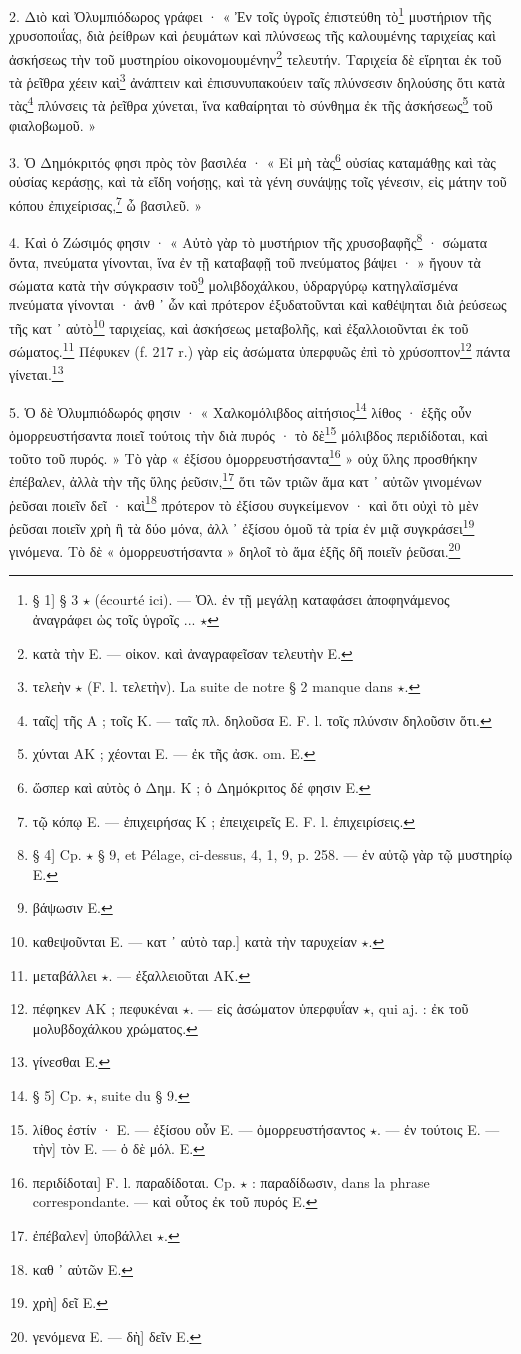 \documentclass[a4paper, 11pt, oneside, polutonikogreek, french]{article}
\begin{document}
2. Διὸ καὶ Ὀλυμπιόδωρος γράφει · « Ἐν τοῖς ὑγροῖς ἐπιστεύθη τὸ\footnote{§ 1] § 3 $\star$ (écourté ici). --- Ὀλ. ἐν τῇ μεγάλῃ καταφάσει ἀποφηνάμενος ἀναγράφει ὡς τοῖς ὑγροῖς ... $\star$} μυστήριον τῆς χρυσοποιΐας, διὰ ῥείθρων καὶ ῥευμάτων καὶ πλύνσεως τῆς καλουμένης ταριχείας καὶ ἀσκήσεως τὴν τοῦ μυστηρίου οἰκονομουμένην\footnote{κατὰ τὴν E. --- οἰκον. καὶ ἀναγραφεῖσαν τελευτὴν E.} τελευτήν. Ταριχεία δὲ εἴρηται ἐκ τοῦ τὰ ῥεῖθρα χέειν καὶ\footnote{τελεὴν $\star$ (F. l. τελετὴν). La suite de notre § 2 manque dans $\star$.} ἀνάπτειν καὶ ἐπισυνυπακούειν ταῖς πλύνσεσιν δηλούσης ὅτι κατὰ τὰς\footnote{ταῖς] τῆς A ; τοῖς K. --- ταῖς πλ. δηλοῦσα E. F. l. τοῖς πλύνσιν δηλοῦσιν ὅτι.} πλύνσεις τὰ ῥεῖθρα χύνεται, ἵνα καθαίρηται τὸ σύνθημα ἐκ τῆς ἀσκήσεως\footnote{χύνται AK ; χέονται E. --- ἐκ τῆς ἀσκ. om. E.} τοῦ φιαλοβωμοῦ. »

3. Ὁ Δημόκριτός φησι πρὸς τὸν βασιλέα · « Εἰ μὴ τὰς\footnote{ὥσπερ καὶ αὐτὸς ὁ Δημ. K ; ὁ Δημόκριτος δέ φησιν E.} οὐσίας καταμάθῃς καὶ τὰς οὐσίας κεράσῃς, καὶ τὰ εἴδη νοήσῃς, καὶ τὰ γένη συνάψῃς τοῖς γένεσιν, εἰς μάτην τοῦ κόπου ἐπιχείρισας,\footnote{τῷ κόπῳ E. --- ἐπιχειρήσας K ; ἐπειχειρεῖς E. F. l. ἐπιχειρίσεις.} ὦ βασιλεῦ. »

4. Καὶ ὁ Ζώσιμός φησιν · « Αὐτὸ γὰρ τὸ μυστήριον τῆς χρυσοβαφῆς\footnote{§ 4] Cp. $\star$ § 9, et Pélage, ci-dessus, 4, 1, 9, p. 258. --- ἐν αὐτῷ γὰρ τῷ μυστηρίῳ E.} · σώματα ὄντα, πνεύματα γίνονται, ἵνα ἐν τῇ καταβαφῇ τοῦ πνεύματος βάψει · » ἤγουν τὰ σώματα κατὰ τὴν σύγκρασιν τοῦ\footnote{βάψωσιν E.} μολιβδοχάλκου, ὑδραργύρῳ κατηγλαϊσμένα πνεύματα γίνονται · ἀνθ ᾽ ὧν καὶ πρότερον ἐξυδατοῦνται καὶ καθέψηται διὰ ῥεύσεως τῆς κατ ᾽ αὐτὸ\footnote{καθεψοῦνται E. --- κατ ᾽ αὐτὸ ταρ.] κατὰ τὴν ταρυχείαν $\star$.} ταριχείας, καὶ ἀσκήσεως μεταβολῆς, καὶ ἐξαλλοιοῦνται ἐκ τοῦ σώματος.\footnote{μεταβάλλει $\star$. --- ἐξαλλειοῦται AK.} Πέφυκεν (f. 217 r.) γὰρ εἰς ἀσώματα ὑπερφυῶς ἐπὶ τὸ χρύσοπτον\footnote{πέφηκεν AΚ ; πεφυκέναι $\star$. --- εἰς ἀσώματον ὑπερφυΐαν $\star$, qui aj. : ἐκ τοῦ μολυβδοχάλκου χρώματος.} πάντα γίνεται.\footnote{γίνεσθαι E.}

5. Ὁ δὲ Ὀλυμπιόδωρός φησιν · « Χαλκομόλιβδος αἰτήσιος\footnote{§ 5] Cp. $\star$, suite du § 9.} λίθος · ἑξῆς οὖν ὁμορρευστήσαντα ποιεῖ τούτοις τὴν διὰ πυρός · τὸ δὲ\footnote{λίθος ἐστίν · E. --- ἐξίσου οὖν E. --- ὁμορρευστήσαντος $\star$. --- ἐν τούτοις E. --- τὴν] τὸν E. --- ὁ δὲ μόλ. E.} μόλιβδος περιδίδοται, καὶ τοῦτο τοῦ πυρός. » Τὸ γὰρ « ἐξίσου ὁμορρευστήσαντα\footnote{περιδίδοται] F. l. παραδίδοται. Cp. $\star$ : παραδίδωσιν, dans la phrase correspondante. --- καὶ οὗτος ἐκ τοῦ πυρός E.} » οὐχ ὕλης προσθήκην ἐπέβαλεν, ἀλλὰ τὴν τῆς ὕλης ῥεῦσιν,\footnote{ἐπέβαλεν] ὑποβάλλει $\star$.} ὅτι τῶν τριῶν ἅμα κατ ᾽ αὐτῶν γινομένων ῥεῦσαι ποιεῖν δεῖ · καὶ\footnote{καθ ᾽ αὑτῶν E.} πρότερον τὸ ἐξίσου συγκείμενον · καὶ ὅτι οὐχὶ τὸ μὲν ῥεῦσαι ποιεῖν χρὴ ἢ τὰ δύο μόνα, ἀλλ ᾽ ἐξίσου ὁμοῦ τὰ τρία ἐν μιᾷ συγκράσει\footnote{χρὴ] δεῖ E.} γινόμενα. Τὸ δὲ « ὁμορρευστήσαντα » δηλοῖ τὸ ἅμα ἑξῆς δῆ ποιεῖν ῥεῦσαι.\footnote{γενόμενα E. --- δὴ] δεῖν E.}
\end{document}
